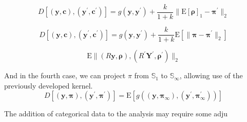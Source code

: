   \[
    D\left[(\bm{y},\bm{c}), (\bm{y}^{\prime}, \bm{c}^{\prime})\right] = 
      g(\bm{y},\bm{y}^{\prime}) + 
          \frac{k}{1 + k}\lVert \text{E}[\bm{\rho}]_1 - \bm{\pi}^{\prime}\rVert_2
  \]
  
  \begin{equation*}
    D\left[(\bm{y},\bm{c}), (\bm{y}^{\prime}, \bm{c}^{\prime})\right] = 
      g(\bm{y},\bm{y}^{\prime}) + 
        \frac{k}{1 + k}\text{E}\left[\lVert \bm{\pi} - \bm{\pi}^{\prime}\rVert_2\right]
  \end{equation*}

  \[
    \text{E}\lVert (R\bm{y},\bm{\rho}), (R^\prime\bm{Y}^\prime,\bm{\rho}^\prime)\rVert_2
  \]


And in the fourth case, we can project $\pi$ from $\mathbb{S}_1$ to 
  $\mathbb{S}_{\infty}$, allowing use of the previously developed kernel.
  \begin{equation*}
    D\left[(\bm{y},\bm{\pi}), (\bm{y}^{\prime}, \bm{\pi}^{\prime})\right] = 
      \text{E}\left[ g\left((\bm{y},\bm{\pi}_{\infty}), 
            (\bm{y}^{\prime},\bm{\pi}_{\infty}^{\prime})\right)\right]
  \end{equation*}

The addition of categorical data to the analysis may require some adju







